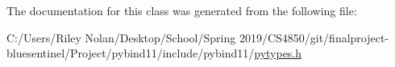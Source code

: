 The documentation for this class was generated from the following file\+:\begin{DoxyCompactItemize}
\item 
C\+:/\+Users/\+Riley Nolan/\+Desktop/\+School/\+Spring 2019/\+C\+S4850/git/finalproject-\/bluesentinel/\+Project/pybind11/include/pybind11/\mbox{\hyperlink{pytypes_8h}{pytypes.\+h}}\end{DoxyCompactItemize}
